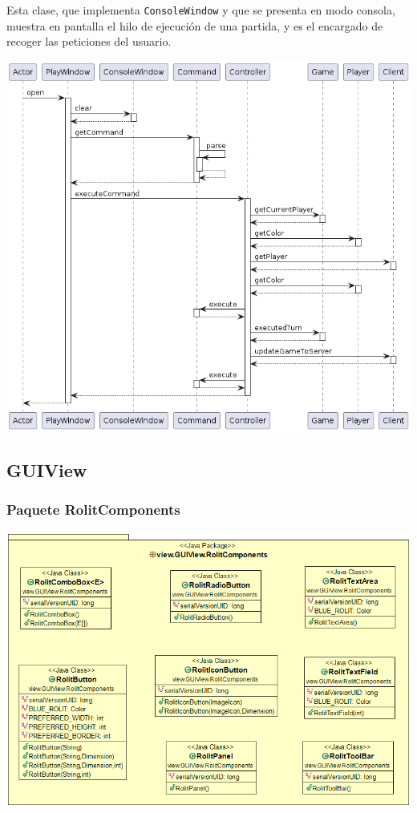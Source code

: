 \documentclass[../DocumentoOficial.tex]{subfiles}
\begin{document}
Esta clase, que implementa \texttt{ConsoleWindow} y que se presenta en modo consola, muestra en pantalla el hilo de ejecución de una partida, y es el encargado de recoger las peticiones del usuario.
\begin{center}
\includegraphics[scale=0.5]{PlayWindow_open.png}
\end{center}

\newpage
\subsection{GUIView}
\subsubsection{Paquete RolitComponents}
\begin{center}
\includegraphics[scale=0.5]{RolitComponents.png} 
\end{center}
\end{document}
